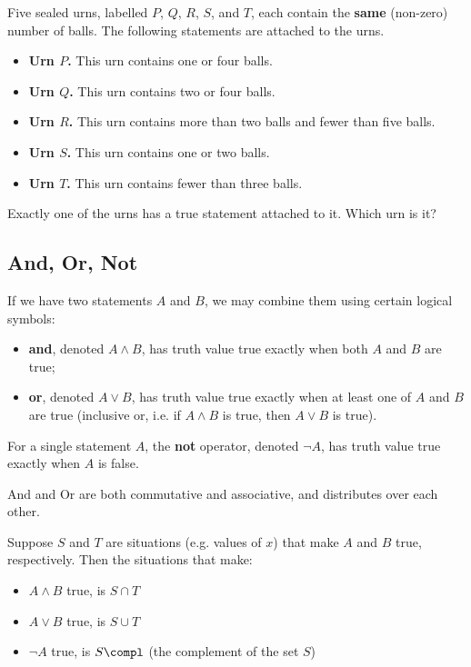 \documentclass{article}
\begin{document}
\begin{example}[TMUA 2016 P2 Q4]
    Five sealed urns, labelled \(P\), \(Q\), \(R\), \(S\), and \(T\), each contain the \textbf{same} (non-zero) number of balls. The following statements are attached to the urns.

    \begin{itemize}
        \item \textbf{Urn \(P\).} This urn contains one or four balls.
        \item \textbf{Urn \(Q\).} This urn contains two or four balls.
        \item \textbf{Urn \(R\).} This urn contains more than two balls and fewer than five balls.
        \item \textbf{Urn \(S\).} This urn contains one or two balls.
        \item \textbf{Urn \(T\).} This urn contains fewer than three balls.
    \end{itemize}

    Exactly one of the urns has a true statement attached to it. Which urn is it?
\end{example}

\subsection{And, Or, Not}

If we have two statements \(A\) and \(B\), we may combine them using certain logical symbols:
\begin{itemize}
    \item \textbf{and}, denoted \(A \land B\), has truth value true exactly when both \(A\) and \(B\) are true;
    \item \textbf{or}, denoted \(A \lor B\), has truth value true exactly when at least one of \(A\) and \(B\) are true (inclusive or, i.e. if \(A \land B\) is true, then \(A \lor B\) is true).
\end{itemize}

For a single statement \(A\), the \textbf{not} operator, denoted \(\lnot A\), has truth value true exactly when \(A\) is false.

And and Or are both commutative and associative, and distributes over each other.

Suppose \(S\) and \(T\) are situations (e.g. values of \(x\)) that make \(A\) and \(B\) true, respectively. Then the situations that make:
\begin{itemize}
    \item \(A \land B\) true, is \(S \cap T\)
    \item \(A \lor B\) true, is \(S \cup T\)
    \item \(\lnot A\) true, is \(S\compl\) (the complement of the set \(S\))
\end{itemize}
\end{document}
